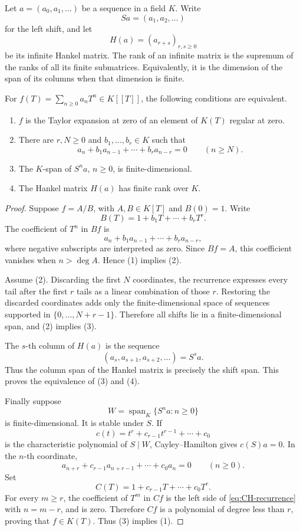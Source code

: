 Let \(a=(a_0,a_1,\ldots)\) be a sequence in a field \(K\).  Write
\[
 Sa=(a_1,a_2,\ldots)
\]
for the left shift, and let
\[
 H(a)=(a_{r+s})_{r,s\geq0}
\]
be its infinite Hankel matrix.  The rank of an infinite matrix is the
supremum of the ranks of all its finite submatrices.  Equivalently, it is
the dimension of the span of its columns when that dimension is finite.

\begin{proposition}
\label{prop:rational-recurrence-hankel}
For \(f(T)=\sum_{n\geq0}a_nT^n\in K[[T]]\), the following conditions are
equivalent.
\begin{enumerate}
\item \(f\) is the Taylor expansion at zero of an element of \(K(T)\)
      regular at zero.
\item There are \(r,N\geq0\) and \(b_1,\ldots,b_r\in K\) such that
      \[
       a_n+b_1a_{n-1}+\cdots+b_ra_{n-r}=0
       \qquad(n\geq N).
       \tag{2.7}\label{eq:eventual-recurrence}
      \]
\item The \(K\)-span of \(S^na\), \(n\geq0\), is finite-dimensional.
\item The Hankel matrix \(H(a)\) has finite rank over \(K\).
\end{enumerate}
\end{proposition}

\begin{proof}
Suppose \(f=A/B\), with \(A,B\in K[T]\) and \(B(0)=1\).  Write
\[
 B(T)=1+b_1T+\cdots+b_rT^r.
\]
The coefficient of \(T^n\) in \(Bf\) is
\[
 a_n+b_1a_{n-1}+\cdots+b_ra_{n-r},
\]
where negative subscripts are interpreted as zero.  Since \(Bf=A\), this
coefficient vanishes when \(n>\deg A\).  Hence (1) implies (2).

Assume (2).  Discarding the first \(N\) coordinates, the recurrence
expresses every tail after the first \(r\) tails as a linear combination
of those \(r\).  Restoring the discarded coordinates adds only the
finite-dimensional space of sequences supported in
\(\{0,\ldots,N+r-1\}\).  Therefore all shifts lie in a
finite-dimensional span, and (2) implies (3).

The \(s\)-th column of \(H(a)\) is the sequence
\[
 (a_s,a_{s+1},a_{s+2},\ldots)=S^sa.
\]
Thus the column span of the Hankel matrix is precisely the shift span.
This proves the equivalence of (3) and (4).

Finally suppose
\[
 W=\operatorname{span}_K\{S^na:n\geq0\}
\]
is finite-dimensional.  It is stable under \(S\).  If
\[
 c(t)=t^r+c_{r-1}t^{r-1}+\cdots+c_0
\]
is the characteristic polynomial of \(S\mid W\), Cayley--Hamilton gives
\(c(S)a=0\).  In the \(n\)-th coordinate,
\[
 a_{n+r}+c_{r-1}a_{n+r-1}+\cdots+c_0a_n=0
 \qquad(n\geq0).
 \tag{2.8}\label{eq:CH-recurrence}
\]
Set
\[
 C(T)=1+c_{r-1}T+\cdots+c_0T^r.
\]
For every \(m\geq r\), the coefficient of \(T^m\) in \(Cf\) is the
left side of \eqref{eq:CH-recurrence} with \(n=m-r\), and is zero.
Therefore \(Cf\) is a polynomial of degree less than \(r\), proving that
\(f\in K(T)\).  Thus (3) implies (1).
\end{proof}

